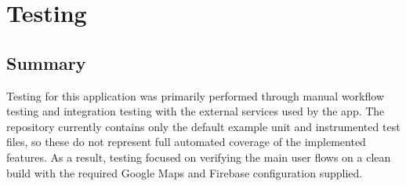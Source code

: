 \documentclass{article}
\begin{document}
            \newpage
                    
                    

            \section{Testing}

                \subsection{Summary}

                    Testing for this application was primarily performed through manual workflow
                    testing and integration testing with the external services used by the app. The
                    repository currently contains only the default example unit and instrumented test
                    files, so these do not represent full automated coverage of the implemented
                    features. As a result, testing focused on verifying the main user flows on a clean
                    build with the required Google Maps and Firebase configuration supplied.
\end{document}
